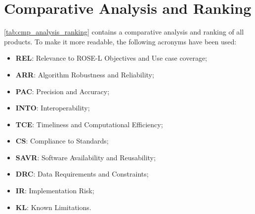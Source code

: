 \section{Comparative Analysis and Ranking}

\autoref{tab:cmp_analysis_ranking} contains a comparative analysis and ranking of all products. To make it more readable, the following acronyms have been used:
\begin{itemize}
    \item \textbf{REL}: Relevance to ROSE-L Objectives and Use case coverage; 
    \item \textbf{ARR}: Algorithm Robustness and Reliability;
    \item \textbf{PAC}: Precision and Accuracy; 
    \item \textbf{INTO}: Interoperability; 
    \item \textbf{TCE}: Timeliness and Computational Efficiency; 
    \item \textbf{CS}: Compliance to Standards; 
    \item \textbf{SAVR}: Software Availability and Reusability; 
    \item \textbf{DRC}: Data Requirements and Constraints;
    \item \textbf{IR}: Implementation Risk; 
    \item \textbf{KL}: Known Limitations.
\end{itemize}


